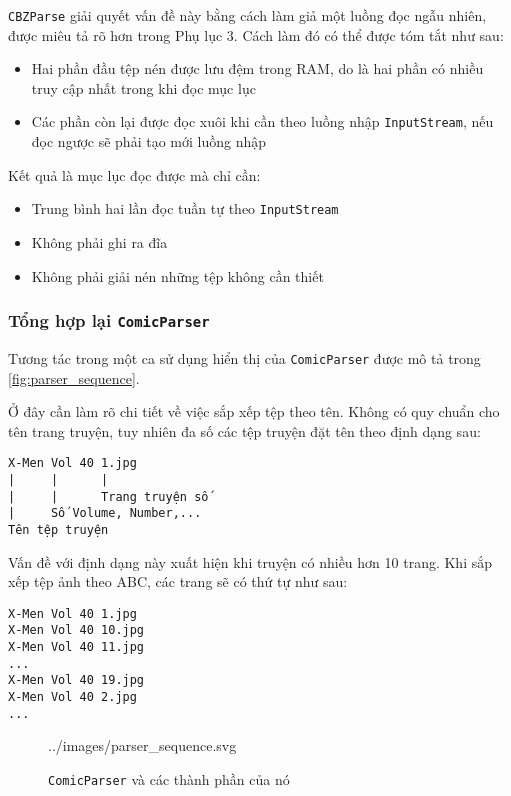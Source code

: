 \documentclass[../../../../thesis]{subfiles}
\begin{document}
\texttt{CBZParse} giải quyết vấn đề này bằng cách làm giả một luồng đọc ngẫu
nhiên, được miêu tả rõ hơn trong Phụ lục 3. Cách làm đó có thể được tóm tắt như
sau:

\begin{itemize}
    \item
        Hai phần đầu tệp nén được lưu đệm trong RAM, do là hai phần có nhiều
        truy cập nhất trong khi đọc mục lục
    \item
        Các phần còn lại được đọc xuôi khi cần theo luồng nhập
        \texttt{InputStream}, nếu đọc ngược sẽ phải tạo mới luồng nhập
\end{itemize}

Kết quả là mục lục đọc được mà chỉ cần:

\begin{itemize}
    \item
        Trung bình hai lần đọc tuần tự theo \texttt{InputStream}
    \item
        Không phải ghi ra đĩa
    \item
        Không phải giải nén những tệp không cần thiết
\end{itemize}

\subsubsection{Tổng hợp lại \texttt{ComicParser}}

Tương tác trong một ca sử dụng hiển thị của \texttt{ComicParser} được mô tả
trong \autoref{fig:parser_sequence}.

Ở đây cần làm rõ chi tiết về việc sắp xếp tệp theo tên. Không có quy chuẩn cho
tên trang truyện, tuy nhiên đa số các tệp truyện đặt tên theo định dạng sau:

\begin{verbatim}
X-Men Vol 40 1.jpg
|     |      |
|     |      Trang truyện số
|     Số Volume, Number,...
Tên tệp truyện
\end{verbatim}

Vấn đề với định dạng này xuất hiện khi truyện có nhiều hơn 10 trang. Khi sắp xếp
tệp ảnh theo ABC, các trang sẽ có thứ tự như sau:

\begin{verbatim}
X-Men Vol 40 1.jpg
X-Men Vol 40 10.jpg
X-Men Vol 40 11.jpg
...
X-Men Vol 40 19.jpg
X-Men Vol 40 2.jpg
...
\end{verbatim}

\begin{figure}[H]
    \centering
    
        {../images/parser_sequence.svg}
    \caption{\texttt{ComicParser} và các thành phần của nó}
    \label{fig:parser_sequence}
\end{figure}
\end{document}
